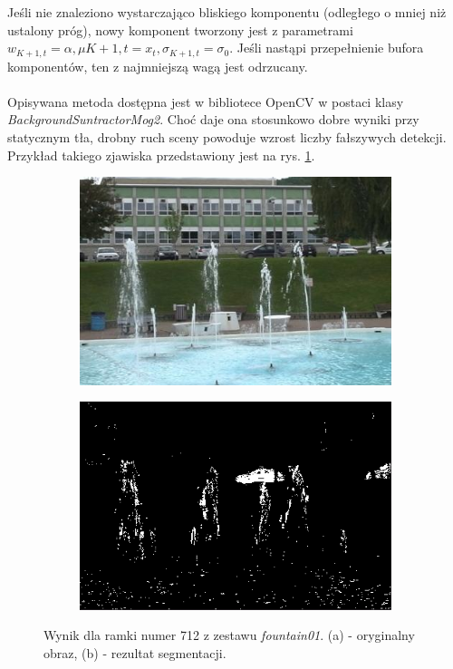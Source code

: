 Jeśli nie znaleziono wystarczająco bliskiego komponentu (odległego o mniej niż ustalony próg), nowy komponent tworzony jest z parametrami $w_{K+1,t} = \alpha, \mu{K+1,t}= x_{t}, \sigma_{K+1,t}=\sigma_{0}$. Jeśli nastąpi przepełnienie bufora komponentów, ten z najmniejszą wagą jest odrzucany. 
\paragraph{}
Opisywana metoda dostępna jest w bibliotece OpenCV w postaci klasy \textit{BackgroundSuntractorMog2}. Choć daje ona stosunkowo dobre wyniki przy statycznym tła, drobny ruch sceny powoduje wzrost liczby fałszywych detekcji. Przykład takiego zjawiska przedstawiony jest na rys. \ref{fig:GMM}.

\begin{figure}[!h]
\centering
\begin{subfigure}[b]{0.4\textwidth}
\includegraphics[width=\textwidth]{img/GMMIn}
\caption{}
\end{subfigure}
\quad
\begin{subfigure}[b]{0.4\textwidth}
\includegraphics[width=\textwidth]{img/GMMOut}
\caption{}
\end{subfigure}
\caption{Wynik dla ramki numer 712 z zestawu \textit{fountain01}. (a) - oryginalny obraz, (b) - rezultat segmentacji.\label{fig:GMM}}
\end{figure}


